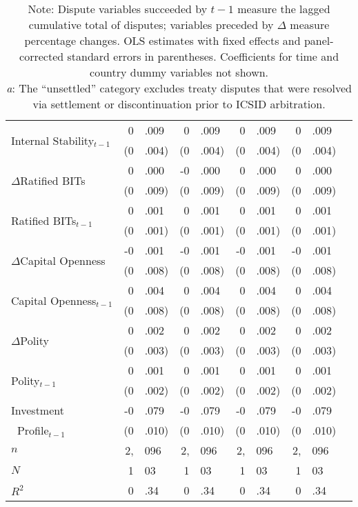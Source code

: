 \documentclass[12pt,onesided]{amsart}
\begin{document}
\begin{table}[ht]
{\begin{tabular}{lr@{} lr@{}lr@{}lr@{}lr@{}}
  \multirow{2}{*}{Internal Stability$_{t-1}$} & 0&.009 &  0&.009 &  0&.009 &  0&.009 \\
  & (0&.004) &  (0&.004) &  (0&.004) &  (0&.004) \\
  \multirow{2}{*}{$\Delta$Ratified BITs} & 0&.000 &  -0&.000 &  0&.000 &  0&.000 \\
  & (0&.009) &  (0&.009) &  (0&.009) &  (0&.009) \\
  \multirow{2}{*}{Ratified BITs$_{t-1}$} & 0&.001 & 0&.001 &  0&.001 &  0&.001 \\
  & (0&.001) & (0&.001) &  (0&.001) &  (0&.001) \\
  \multirow{2}{*}{$\Delta$Capital Openness} & -0&.001 & -0&.001 &  -0&.001 &  -0&.001 \\
  & (0&.008) &  (0&.008) &  (0&.008) &  (0&.008) \\
  \multirow{2}{*}{Capital Openness$_{t-1}$} & 0&.004 & 0&.004 &  0&.004 &  0&.004 \\
  & (0&.008) & (0&.008) & (0&.008) & (0&.008) \\
  \multirow{2}{*}{$\Delta$Polity} & 0&.002 & 0&.002 &  0&.002 &  0&.002  \\
  & (0&.003) & (0&.003) &  (0&.003) &  (0&.003) \\
  \multirow{2}{*}{Polity$_{t-1}$} & 0&.001 & 0&.001 &  0&.001 &  0&.001 \\
  & (0&.002) & (0&.002) &  (0&.002) &  (0&.002) \\
    Investment & -0&.079 & -0&.079 & -0&.079 & -0&.079 \\
  $\;\;$Profile$_{t-1}$ & (0&.010) & (0&.010) & (0&.010) & (0&.010) \\
	\hline
	$n$ & 2,&096 & 2,&096 & 2,&096 & 2,&096 \\
	$N$ & 1&03 & 1&03 & 1&03 & 1&03 \\
	$R^{2}$ & 0&.34 & 0&.34 & 0&.34 & 0&.34 \\
	\hline\hline
\end{tabular}
\caption*{Note: Dispute variables succeeded by ${t-1}$ measure the lagged cumulative total of disputes; variables preceded by $\Delta$ measure percentage changes. OLS estimates with fixed effects and panel-corrected standard errors in parentheses. Coefficients for time and country dummy variables not shown. \\ \textit{a}: The ``unsettled'' category excludes treaty disputes that were resolved via settlement or discontinuation prior to ICSID arbitration.}
}
\end{table}
\FloatBarrier
\end{document}
